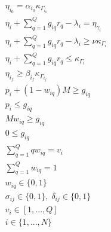 \documentclass[letterpaper, 10pt, conference]{IEEEtran}
\begin{document}
\begin{subequations}
\label{eq:dynconstrs}
\begin{align}
    \eta_{i_0} = \alpha_{i_0} \kappa_{\Gamma_{i_0}}                          \label{subeq:init_charge}  \\
    \eta_i + \sum_{q=1}^Q g_{iq} r_q - \lambda_i = \eta_{\gamma_i}          \label{subeq:next_charge}  \\
    \eta_i + \sum_{q=1}^Q g_{iq} r_q - \lambda_i \geq \nu \kappa_{\Gamma_i} \label{subeq:min_charge}   \\
    \eta_i + \sum_{q=1}^Q g_{iq} r_q \leq \kappa_{\Gamma_i}                 \label{subeq:max_charge}   \\
    \eta_{i_f} \geq \beta_{i_f} \kappa_{\Gamma_{i_f}}                        \label{subeq:final_charge} \\
    p_i + (1 - w_{iq})M \geq g_{iq}                                      \label{subeq:gpgret}       \\
    p_i \leq g_{iq}                                                     \label{subeq:gples}        \\
    Mw_{iq} \geq g_{iq}                                                  \label{subeq:gwgret}       \\
    0 \leq g_{iq}                                                       \label{subeq:gwles}        \\
    \sum_{q=1}^Q qw_{iq} = v_i                                            \label{subeq:wmax}         \\
    \sum_{q=1}^Q w_{iq} = 1                                               \label{subeq:wone}         \\
    w_{iq} \in \{0,1\}                                                   \label{subeq:wspace}       \\
    \sigma_{ij} \in \{0,1\},\;\delta_{ij} \in \{0,1\}\;                   \label{subeq:sdspace}      \\
    v_i \in  [1,...,Q ]                                                  \label{subeq:vspace}       \\
    i \in \{1,...,N\}                                                    \label{subeq:ispace}
\end{align}
\end{subequations}
\end{document}
